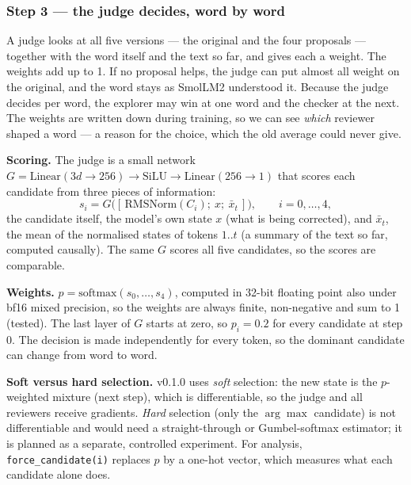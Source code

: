 \documentclass[a4paper,12pt,parskip=half,headsepline]{scrartcl}
\newcommand{\code}[1]{\texttt{\small #1}}
\begin{document}
\subsubsection*{Step 3 --- the judge decides, word by word}

\begin{plain}
A judge looks at all five versions --- the original and the four proposals --- together
with the word itself and the text so far, and gives each a weight. The weights add up
to 1. If no proposal helps, the judge can put almost all weight on the original, and
the word stays as SmolLM2 understood it. Because the judge decides per word, the
explorer may win at one word and the checker at the next. The weights are written
down during training, so we can see \emph{which} reviewer shaped a word --- a reason
for the choice, which the old average could never give.
\end{plain}

\begin{tech}
\textbf{Scoring.} The judge is a small network
$G = \text{Linear}(3d \to 256) \to \text{SiLU} \to \text{Linear}(256 \to 1)$ that scores
each candidate from three pieces of information:
\[
s_i = G\big([\,\text{RMSNorm}(C_i);\ x;\ \bar x_t\,]\big),\qquad i = 0,\dots,4,
\]
the candidate itself, the model's own state $x$ (what is being corrected), and
$\bar x_t$, the mean of the normalised states of tokens $1..t$ (a summary of the text so
far, computed causally). The same $G$ scores all five candidates, so the scores are
comparable.

\textbf{Weights.} $p = \text{softmax}(s_0,\dots,s_4)$, computed in 32-bit floating point
also under bf16 mixed precision, so the weights are always finite, non-negative and sum to
1 (tested). The last layer of $G$ starts at zero, so $p_i = 0.2$ for every candidate at
step 0. The decision is made independently for every token, so the dominant candidate can
change from word to word.

\textbf{Soft versus hard selection.} v0.1.0 uses \emph{soft} selection: the new state is
the $p$-weighted mixture (next step), which is differentiable, so the judge and all
reviewers receive gradients. \emph{Hard} selection (only the $\arg\max$ candidate) is not
differentiable and would need a straight-through or Gumbel-softmax estimator; it is
planned as a separate, controlled experiment. For analysis, \code{force\_candidate(i)}
replaces $p$ by a one-hot vector, which measures what each candidate alone does.
\end{tech}
\end{document}
